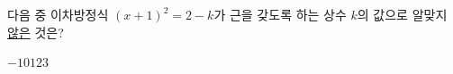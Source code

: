 다음 중 이차방정식 $(x+1)^2=2-k$가 근을 갖도록 하는 상수 $k$의 값으로 알맞지 \underline{않은} 것은?
\begin{choices32}{$-1$}{$0$}{$1$}{$2$}{$3$}\end{choices32}
